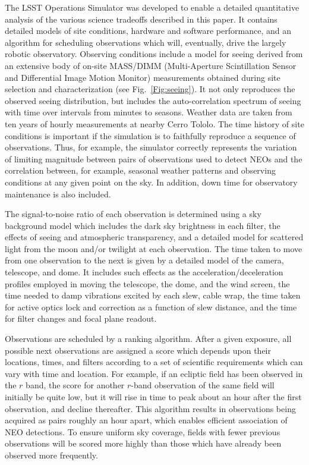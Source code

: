 \documentclass{emulateapj}
\begin{document}
{The LSST Operations Simulator was developed to enable a 
detailed quantitative analysis of the various science tradeoffs described in 
this paper. It contains detailed models of site conditions, hardware and
software performance, and an algorithm for scheduling observations which will, 
eventually, drive the largely robotic observatory. 
Observing conditions include a model for seeing derived from an extensive body
of on-site MASS/DIMM (Multi-Aperture Scintillation Sensor and Differential
Image Motion Monitor) measurements obtained during site selection and
characterization (see Fig.~\ref{Fig:seeing}). It not only reproduces the 
observed seeing distribution, but includes 
the auto-correlation spectrum of seeing with time over intervals from minutes 
to seasons. Weather data are taken from ten years of hourly measurements at
nearby Cerro Tololo. The time history of site conditions is important if the 
simulation is to faithfully reproduce a sequence of observations. Thus, for
example, the simulator correctly represents the variation of limiting
magnitude between pairs of observations used to detect NEOs and the
correlation between, for example, seasonal weather patterns and observing
conditions at any given point on the sky.  In addition, down time for
observatory maintenance is also included. 

The signal-to-noise ratio of each 
observation is determined using a sky background model which includes the dark
sky brightness in each filter, the effects of seeing and atmospheric
transparency, and a detailed model for scattered light from the moon and/or 
twilight at each observation. The time taken to move from one observation to
the next is given by a detailed model of the camera, telescope, and dome. It 
includes such effects as the acceleration/deceleration profiles employed in 
moving the telescope, the dome, and the wind screen, 
the time needed to damp vibrations excited by each slew, 
cable wrap, the time taken for active optics lock and correction as a function of 
slew distance, and the time for filter changes and focal plane readout. 

Observations are scheduled by a ranking algorithm. After a given exposure, all 
possible next observations are assigned a score which depends upon their locations, times,
and filters according to a set of scientific requirements which can vary with 
time and location. For example, if an ecliptic field has been observed in the
$r$ band, the score for another $r$-band observation of the same field will 
initially be quite low, but it will rise in time to peak about an hour after
the first observation, and decline thereafter. This algorithm results in
observations being acquired as pairs roughly an hour apart, which enables
efficient association of NEO detections. To ensure uniform 
sky coverage, fields with fewer previous observations will be scored more
highly than those which have already been observed more frequently.
 
}
\end{document}
